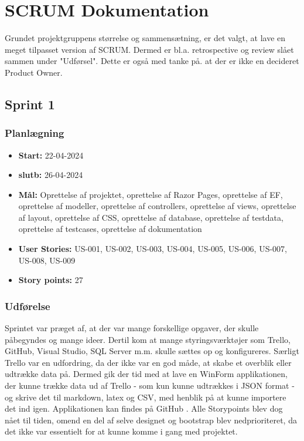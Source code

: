 \chapter{SCRUM Dokumentation}
\label{chapter:scrum-documentation}
Grundet projektgruppens størrelse og sammensætning, er det valgt, at lave en meget tilpasset version af SCRUM. Dermed er bl.a. retrospective og review slået sammen under "Udførsel". Dette er også med tanke på. at der er ikke en decideret Product Owner.

\section{Sprint 1}
\label{sec:sprint-1}
\subsection{Planlægning}
\label{subsec:sprint-1-plan}
\begin{itemize}
    \item \textbf{Start:} 22-04-2024
    \item \textbf{slutb:} 26-04-2024
    \item \textbf{Mål:} Oprettelse af projektet, oprettelse af Razor Pages, oprettelse af EF, oprettelse af modeller, oprettelse af controllers, oprettelse af views, oprettelse af layout, oprettelse af CSS, oprettelse af database, oprettelse af testdata, oprettelse af testcases, oprettelse af dokumentation
    \item \textbf{User Stories:} US-001, US-002, US-003, US-004, US-005, US-006, US-007, US-008, US-009
    \item \textbf{Story points:} 27
\end{itemize}

\subsection{Udførelse}
\label{subsec:sprint-1-udforelse}
Sprintet var præget af, at der var mange forskellige opgaver, der skulle påbegyndes og mange ideer.
Dertil kom at mange styringsværktøjer som Trello, GitHub, Visual Studio, SQL Server m.m. skulle sættes op og konfigureres.
Særligt Trello var en udfordring, da der ikke var en god måde, at skabe et overblik eller udtrække data på.
Dermed gik der tid med at lave en WinForm applikationen, der kunne trække data ud af Trello - som kun kunne udtrækkes i JSON format - og skrive det til markdown, latex og CSV, med henblik på at kunne importere det ind igen.
Applikationen kan findes på GitHub \cite{trello-converter}.
Alle Storypoints blev dog nået til tiden, omend en del af selve designet og bootstrap blev nedprioriteret, da det ikke var essentielt for at kunne komme i gang med projektet.

